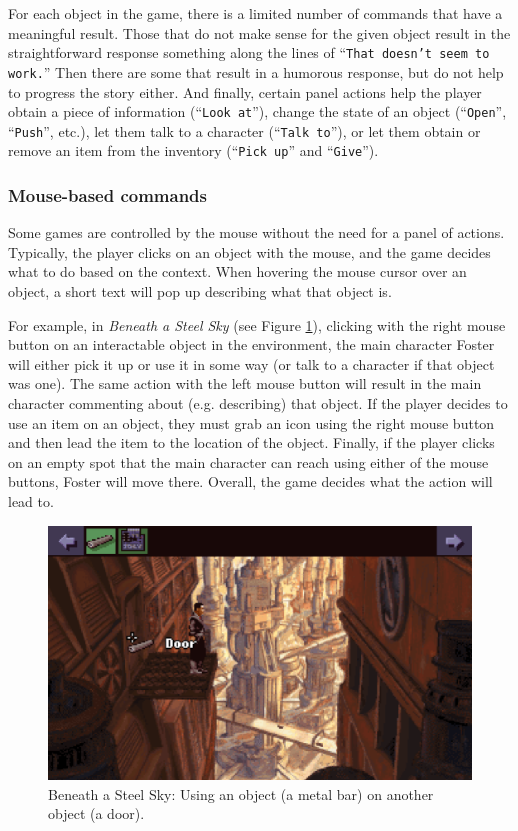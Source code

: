 For each object in the game, there is a limited number of commands that have a meaningful result. Those that do not make sense for the given object result in the straightforward response something along the lines of “\texttt{That doesn't seem to work.}”  Then there are some that result in a humorous response, but do not help to progress the story either. And finally, certain panel actions help the player obtain a piece of information (“\texttt{Look at}”), change the state of an object (“\texttt{Open}”, “\texttt{Push}”, etc.), let them talk to a character (“\texttt{Talk to}”), or let them obtain or remove an item from the inventory (“\texttt{Pick up}” and “\texttt{Give}”).

\subsubsection{Mouse-based commands}
Some games are controlled by the mouse without the need for a panel of actions. Typically, the player clicks on an object with the mouse, and the game decides what to do based on the context. When hovering the mouse cursor over an object, a short text will pop up describing what that object is.

For example, in \textit{Beneath a Steel Sky} (see Figure \ref{fig:C-BaSS}), clicking with the right mouse button on an interactable object in the environment, the main character Foster will either pick it up or use it in some way (or talk to a character if that object was one). The same action with the left mouse button will result in the main character commenting about (e.g. describing) that object. If the player decides to use an item on an object, they must grab an icon using the right mouse button and then lead the item to the location of the object. Finally, if the player clicks on an empty spot that the main character can reach using either of the mouse buttons, Foster will move there. Overall, the game decides what the action will lead to.

\begin{figure}[H]
\centering
\includegraphics[width=.8\linewidth]{img/C-BaSS.png}
\caption{Beneath a Steel Sky: Using an object (a metal bar) on another object (a door).}
\label{fig:C-BaSS}
\end{figure}

